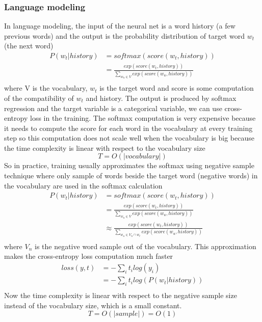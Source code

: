 \documentclass[12pt]{WSUThesis}
\theoremstyle{definition}
\begin{document}
\subsubsection{Language modeling}
In language modeling, the input of the neural net is a word history (a few previous words) and the output is the probability distribution of target word $ w_t $ (the next word)
\begin{align*}
	P(w_t | history)
	&= softmax(score(w_t, history)) \\
	&= \frac{exp(score(w_t, history))}{\sum_{w_u \in V}exp(score(w_u, history))}\\
\end{align*}
where V is the vocabulary, $ w_t $ is the target word and score is some computation of the compatibility of $ w_t $ and history.
The output is produced by softmax regression and the target variable is a categorical variable, we can use cross-entropy loss in the training.
The softmax computation is very expensive because it needs to compute the score for each word in the vocabulary at every training step so this computation does not scale well when the vocabulary is big because the time complexity is linear with respect to the vocabulary size
\[T = O(|vocabulary|)\]
So in practice, training usually approximates the softmax using negative sample technique where only sample of words beside the target word (negative words) in the vocabulary are used in the softmax calculation
\begin{align*}
	P(w_t | history)
	&= softmax(score(w_t, history)) \\
	&= \frac{exp(score(w_t, history))}{\sum_{w_u \in V}exp(score(w_u, history))}\\
	&\approx \frac{exp(score(w_t, history))}{\sum_{w_u \in V_n \cap {w_t}}exp(score(w_u, history))}\\
\end{align*}
where $ V_n $ is the negative word sample out of the vocabulary.
This approximation makes the cross-entropy loss computation much faster \cite{mnih2013learning}
\begin{align*}
	loss(y, t)
	&= - \sum_i t_i log(y_i)\\
	&= - \sum_i t_i log(P(w_t | history))\\
\end{align*}
Now the time complexity is linear with respect to the negative sample size instead of the vocabulary size, which is a small constant.
\[T = O(|sample|) = O(1)\]
\end{document}
